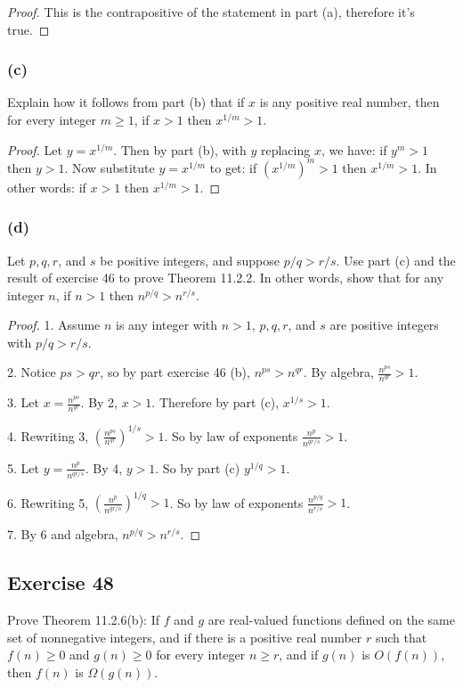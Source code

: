 \documentclass[14pt]{extarticle}
\newcommand{\dps}{\displaystyle}
\begin{document}
\begin{proof}
This is the contrapositive of the statement in part (a), therefore it's true.
\end{proof}

\subsubsection{(c)}
Explain how it follows from part (b) that if \(x\) is any positive real number, then for every integer \(m \geq 1\), if 
\(x > 1\) then \(x^{1/m} > 1\).

\begin{proof}
Let \(y = x^{1/m}\). Then by part (b), with \(y\) replacing \(x\), we have: if \(y^m > 1\) then \(y > 1\). Now substitute
\(y = x^{1/m}\) to get: if \((x^{1/m})^m > 1\) then 
\(x^{1/m} > 1\). In other words: if \(x > 1\) then \(x^{1/m} > 1\).
\end{proof}

\subsubsection{(d)}
Let \(p, q, r\), and \(s\) be positive integers, and suppose \(p/q > r/s\). Use part (c) and the result of exercise 46 to 
prove Theorem 11.2.2. In other words, show that for any integer \(n\), if \(n > 1\) then \(n^{p/q} > n^{r/s}\).

\begin{proof}
1. Assume \(n\) is any integer with \(n > 1\), \(p, q, r\), and \(s\) are positive integers with \(p/q > r/s\).

2. Notice \(ps > qr\), so by part exercise 46 (b), \(n^{ps} > n^{qr}\). By algebra, \(\dps \frac{n^{ps}}{n^{qr}} > 1\).

3. Let \(\dps x = \frac{n^{ps}}{n^{qr}}\). By 2, \(x > 1\). Therefore by part (c), \(x^{1/s} > 1\).

4. Rewriting 3, \(\dps \left(\frac{n^{ps}}{n^{qr}}\right)^{1/s} > 1\). 
So by law of exponents \(\dps \frac{n^p}{n^{qr/s}}>1\).

5. Let \(\dps y = \frac{n^p}{n^{qr/s}}\). By 4, \(y > 1\). So by part (c) \(y^{1/q} > 1\).

6. Rewriting 5, \(\dps \left(\frac{n^p}{n^{qr/s}}\right)^{1/q} > 1\). 
So by law of exponents \(\dps \frac{n^{p/q}}{n^{r/s}} > 1\).

7. By 6 and algebra, \(n^{p/q} > n^{r/s}\).
\end{proof}

\subsection{Exercise 48}
Prove Theorem 11.2.6(b): If \(f\) and \(g\) are real-valued functions defined on the same set of nonnegative integers, and 
if there is a positive real number \(r\) such that \(f(n) \geq 0\) and \(g(n) \geq 0\) for every integer \(n \geq r\), and if 
\(g(n)\) is \(O(f(n))\), then \(f(n)\) is \(\Omega(g(n))\).
\end{document}
